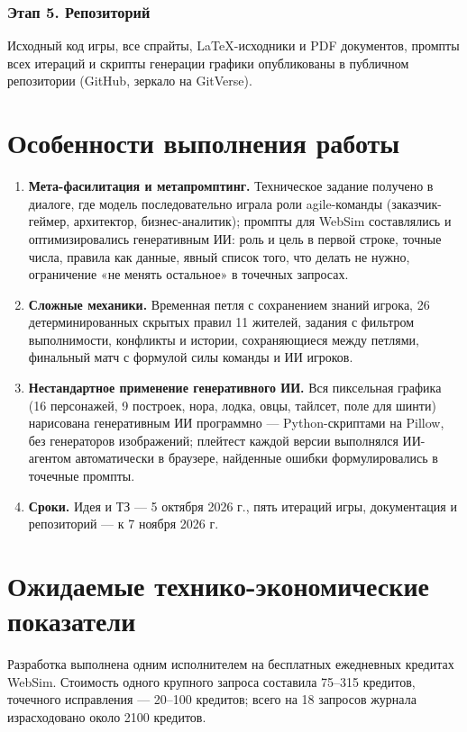 \documentclass[12pt]{article}
\begin{document}
\subsubsection{Этап 5. Репозиторий}
Исходный код игры, все спрайты, \LaTeX-исходники и PDF документов, промпты всех итераций и скрипты генерации графики опубликованы в публичном репозитории (GitHub, зеркало на GitVerse).

\section{Особенности выполнения работы}
\begin{enumerate}
\item \textbf{Мета-фасилитация и метапромптинг.} Техническое задание получено в диалоге, где модель последовательно играла роли agile-команды (заказчик-геймер, архитектор, бизнес-аналитик); промпты для WebSim составлялись и оптимизировались генеративным ИИ: роль и цель в первой строке, точные числа, правила как данные, явный список того, что делать не нужно, ограничение «не менять остальное» в точечных запросах.
\item \textbf{Сложные механики.} Временная петля с сохранением знаний игрока, 26 детерминированных скрытых правил 11 жителей, задания с фильтром выполнимости, конфликты и истории, сохраняющиеся между петлями, финальный матч с формулой силы команды и ИИ игроков.
\item \textbf{Нестандартное применение генеративного ИИ.} Вся пиксельная графика (16 персонажей, 9 построек, нора, лодка, овцы, тайлсет, поле для шинти) нарисована генеративным ИИ программно — Python-скриптами на Pillow, без генераторов изображений; плейтест каждой версии выполнялся ИИ-агентом автоматически в браузере, найденные ошибки формулировались в точечные промпты.
\item \textbf{Сроки.} Идея и ТЗ — 5 октября 2026 г., пять итераций игры, документация и репозиторий — к 7 ноября 2026 г.
\end{enumerate}

\section{Ожидаемые технико-экономические показатели}
Разработка выполнена одним исполнителем на бесплатных ежедневных кредитах WebSim. Стоимость одного крупного запроса составила 75–315 кредитов, точечного исправления — 20–100 кредитов; всего на 18 запросов журнала израсходовано около 2100 кредитов.
\end{document}
